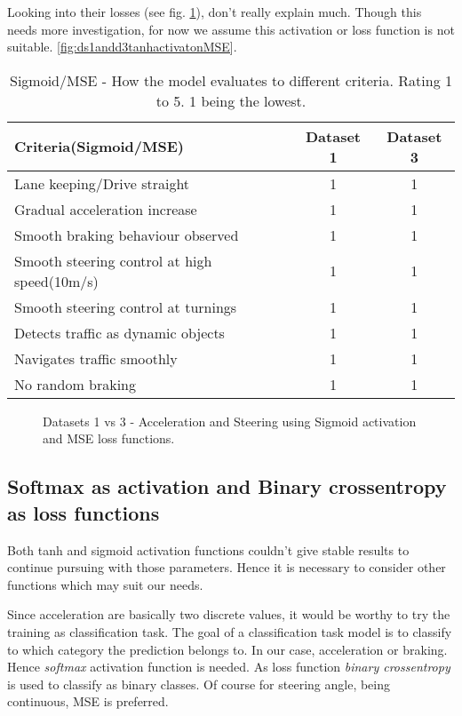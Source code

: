 Looking into their losses (see fig. \ref{fig:ds1andd3SigactivatonMSE}), don't really
explain much. Though this needs more investigation, for now we assume this activation or
loss function is not suitable.
\ref{fig:ds1andd3tanhactivatonMSE}.
\begin{table}[!ht]
    \centering
\begin{tabular}{lcc}
    \toprule
    Criteria(Sigmoid/MSE) & Dataset 1 & Dataset 3 \\\midrule
    Lane keeping/Drive straight  & 1 & 1  \\
    Gradual acceleration increase & 1 & 1\\
    Smooth braking behaviour observed & 1 & 1 \\
    Smooth steering control at high speed(10m/s) & 1 & 1 \\
    Smooth steering control at turnings & 1 & 1\\
    Detects traffic as dynamic objects & 1 & 1\\
    Navigates traffic smoothly & 1 & 1\\
    No random braking & 1 & 1 \\\bottomrule
\end{tabular}
\caption{Sigmoid/MSE - How the model evaluates to different criteria. Rating 1 to 5. 1
being the lowest.}
\label{table:sigmse}
\end{table}

\begin{figure}[!ht]
	\centering
    \def\svgwidth{\textwidth}
    
    \caption{Datasets 1 vs 3 - Acceleration and Steering using Sigmoid activation and MSE loss
    functions.}
    \label{fig:ds1andd3SigactivatonMSE}
\end{figure}

\subsection{Softmax as activation and Binary crossentropy as loss functions}
Both tanh and sigmoid activation functions couldn't give stable results to continue
pursuing with those parameters. Hence it is necessary to consider other functions which
may suit our needs.

Since acceleration are basically two discrete values, it would be worthy to try the
training as classification task. The goal of a classification task model is to classify to
which category the prediction belongs to. In our case, acceleration or braking. Hence
\textit{softmax} activation function is needed. As loss function \textit{binary
crossentropy} is used to classify as binary classes. Of course for steering angle,
being continuous, MSE is preferred.

